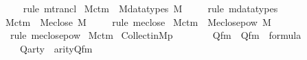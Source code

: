 \begin{isabellebody}
%
\isadelimproof
\ \ %
\endisadelimproof
%
\isatagproof
{}\isamarkupfalse%
\ \ {\isacharparenleft}{\kern0pt}rule\ mtrancl{\isacharparenright}{\kern0pt}%
\endisatagproof
{\isafoldproof}%
%
\isadelimproof
\isanewline
%
\endisadelimproof
\isanewline
{}\isamarkupfalse%
\ M{\isacharunderscore}{\kern0pt}ctm\ {\isasymsubseteq}\ M{\isacharunderscore}{\kern0pt}datatypes\ {\isachardoublequoteopen}{\isacharhash}{\kern0pt}{\isacharhash}{\kern0pt}M{\isachardoublequoteclose}\isanewline
%
\isadelimproof
\ \ %
\endisadelimproof
%
\isatagproof
{}\isamarkupfalse%
\ \ {\isacharparenleft}{\kern0pt}rule\ mdatatypes{\isacharparenright}{\kern0pt}%
\endisatagproof
{\isafoldproof}%
%
\isadelimproof
\isanewline
%
\endisadelimproof
\isanewline
{}\isamarkupfalse%
\ M{\isacharunderscore}{\kern0pt}ctm\ {\isasymsubseteq}\ M{\isacharunderscore}{\kern0pt}eclose\ {\isachardoublequoteopen}{\isacharhash}{\kern0pt}{\isacharhash}{\kern0pt}M{\isachardoublequoteclose}\isanewline
%
\isadelimproof
\ \ %
\endisadelimproof
%
\isatagproof
{}\isamarkupfalse%
\ \ {\isacharparenleft}{\kern0pt}rule\ meclose{\isacharparenright}{\kern0pt}%
\endisatagproof
{\isafoldproof}%
%
\isadelimproof
\isanewline
%
\endisadelimproof
\isanewline
{}\isamarkupfalse%
\ M{\isacharunderscore}{\kern0pt}ctm\ {\isasymsubseteq}\ M{\isacharunderscore}{\kern0pt}eclose{\isacharunderscore}{\kern0pt}pow\ {\isachardoublequoteopen}{\isacharhash}{\kern0pt}{\isacharhash}{\kern0pt}M{\isachardoublequoteclose}\isanewline
%
\isadelimproof
\ \ %
\endisadelimproof
%
\isatagproof
{}\isamarkupfalse%
\ \ {\isacharparenleft}{\kern0pt}rule\ meclose{\isacharunderscore}{\kern0pt}pow{\isacharparenright}{\kern0pt}%
\endisatagproof
{\isafoldproof}%
%
\isadelimproof
\isanewline
%
\endisadelimproof
\isanewline
\isanewline
\isanewline
{}\isamarkupfalse%
\ M{\isacharunderscore}{\kern0pt}ctm\isanewline
{}%
\isadelimdocument
%
\endisadelimdocument
%
\isatagdocument
%
\isamarkuptrue%
%
\endisatagdocument
{\isafolddocument}%
%
\isadelimdocument
%
\endisadelimdocument
{}\isamarkupfalse%
\ Collect{\isacharunderscore}{\kern0pt}in{\isacharunderscore}{\kern0pt}M{\isacharunderscore}{\kern0pt}{}p\ {\isacharcolon}{\kern0pt}\isanewline
\ \ \isanewline
\ \ \ \ Qfm\ {\isacharcolon}{\kern0pt}\ {\isachardoublequoteopen}Q{\isacharunderscore}{\kern0pt}fm\ {\isasymin}\ formula{\isachardoublequoteclose}\ \isanewline
\ \ \ \ Qarty\ {\isacharcolon}{\kern0pt}\ {\isachardoublequoteopen}arity{\isacharparenleft}{\kern0pt}Q{\isacharunderscore}{\kern0pt}fm{\isacharparenright}{\kern0pt}\ {\isacharequal}{\kern0pt}\ {}{\isachardoublequoteclose}\ \isanewline

\end{isabellebody}
